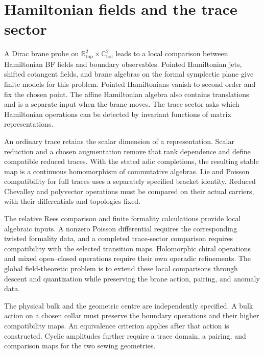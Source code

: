 \chapter*{Hamiltonian fields and the trace sector}

A Dirac brane probe on $\mathbb R^2_{\mathrm{top}}\times\mathbb C^2_{\mathrm{hol}}$ leads to a local comparison between Hamiltonian BF fields and boundary observables. Pointed Hamiltonian jets, shifted cotangent fields, and brane algebras on the formal symplectic plane give finite models for this problem. Pointed Hamiltonians vanish to second order and fix the chosen point. The affine Hamiltonian algebra also contains translations and is a separate input when the brane moves. The trace sector asks which Hamiltonian operations can be detected by invariant functions of matrix representations.

An ordinary trace retains the scalar dimension of a representation. Scalar reduction and a chosen augmentation remove that rank dependence and define compatible reduced traces. With the stated adic completions, the resulting stable map is a continuous homomorphism of commutative algebras. Lie and Poisson compatibility for full traces uses a separately specified bracket identity. Reduced Chevalley and polyvector operations must be compared on their actual carriers, with their differentials and topologies fixed.

The relative Rees comparison and finite formality calculations provide local algebraic inputs. A nonzero Poisson differential requires the corresponding twisted formality data, and a completed trace-sector comparison requires compatibility with the selected transition maps. Holomorphic chiral operations and mixed open--closed operations require their own operadic refinements. The global field-theoretic problem is to extend these local comparisons through descent and quantization while preserving the brane action, pairing, and anomaly data.

The physical bulk and the geometric centre are independently specified. A bulk action on a chosen collar must preserve the boundary operations and their higher compatibility maps. An equivalence criterion applies after that action is constructed. Cyclic amplitudes further require a trace domain, a pairing, and comparison maps for the two sewing geometries.
